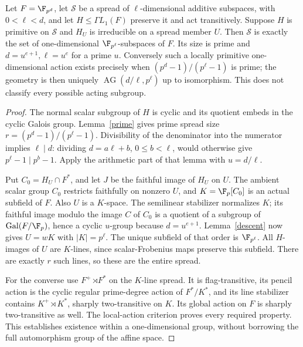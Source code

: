 \begin{theorem}\label{spread}
Let $F=\F_{p^d}$, let $\mathcal S$ be a spread of $\ell$-dimensional
additive subspaces, with $0<\ell<d$, and let
$H\le\Gamma L_1(F)$ preserve it and act transitively. Suppose $H$
is primitive on $\mathcal S$ and $H_U$ is irreducible on a spread
member $U$. Then $\mathcal S$ is exactly the set of one-dimensional
$\F_{p^\ell}$-subspaces of $F$. Its size is prime and
$d=u^{e+1},\ell=u^e$ for a prime $u$.
Conversely such a locally primitive one-dimensional action exists
precisely when $(p^d-1)/(p^\ell-1)$ is prime; the geometry is then
uniquely $\operatorname{AG}(d/\ell,p^\ell)$ up to isomorphism.
This does not classify every possible acting subgroup.
\end{theorem}
\begin{proof}
The normal scalar subgroup of $H$ is cyclic and its quotient embeds
in the cyclic Galois group. Lemma~\ref{prime} gives prime spread size
$r=(p^d-1)/(p^\ell-1)$. Divisibility of the denominator into the
numerator implies $\ell\mid d$: dividing $d=a\ell+b$, $0\le b<\ell$,
would otherwise give $p^\ell-1\mid p^b-1$. Apply the arithmetic part
of that lemma with $u=d/\ell$.

Put $C_0=H_U\cap F^*$, and let $J$ be the faithful image of $H_U$
on $U$. The ambient scalar group $C_0$ restricts faithfully on nonzero
$U$, and $K=\F_p[C_0]$ is an actual subfield of $F$. Also $U$ is a
$K$-space. The semilinear stabilizer normalizes $K$; its faithful
image modulo the image $C$ of $C_0$ is a quotient of a subgroup of
$\operatorname{Gal}(F/\F_p)$, hence a cyclic $u$-group because
$d=u^{e+1}$. Lemma~\ref{descent} now gives $U=wK$ with
$|K|=p^\ell$. The unique subfield of that order is $\F_{p^\ell}$.
All $H$-images of $U$ are $K$-lines, since scalar-Frobenius maps
preserve this subfield. There are exactly $r$ such lines, so these
are the entire spread.

For the converse use $F^+$\,$\rtimes F^*$ on the $K$-line spread.
It is flag-transitive, its pencil action is the cyclic regular
prime-degree action of $F^*/K^*$, and its line stabilizer contains
$K^+\rtimes K^*$, sharply two-transitive on $K$. Its global action
on $F$ is sharply two-transitive as well. The local-action criterion
proves every required property. This establishes existence within a
one-dimensional group, without borrowing the full automorphism group
of the affine space.
\end{proof}


